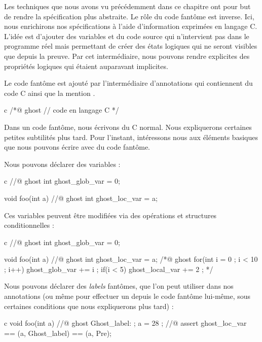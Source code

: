 Les techniques que nous avons vu précédemment dans ce chapitre ont pour but de
rendre la spécification plus abstraite. Le rôle du code fantôme est inverse. Ici,
nous enrichirons nos spécifications à l'aide d'information exprimées
en langage C. L'idée est d'ajouter des variables et du code source qui
n'intervient pas dans le programme réel mais permettant de créer des états
logiques qui ne seront visibles que depuis la preuve. Par cet intermédiaire,
nous pouvons rendre explicites des propriétés logiques qui étaient auparavant
implicites.




Le code fantôme est ajouté par l'intermédiaire d'annotations qui contiennent
du code C ainsi que la mention .



\begin{CodeBlock}{c}
/*@
  ghost
  // code en langage C
*/
\end{CodeBlock}


Dans un code fantôme, nous écrivons du C normal. Nous expliquerons certaines
petites subtilités plus tard. Pour l'instant, intéressons nous aux éléments
basiques que nous pouvons écrire avec du code fantôme.


Nous pouvons déclarer des variables :


\begin{CodeBlock}{c}
//@ ghost int ghost_glob_var = 0;

void foo(int a){
  //@ ghost int ghost_loc_var = a;
}
\end{CodeBlock}


Ces variables peuvent être modifiées via des opérations et structures
conditionnelles :


\begin{CodeBlock}{c}
//@ ghost int ghost_glob_var = 0;

void foo(int a){
  //@ ghost int ghost_loc_var = a;
  /*@ ghost
    for(int i = 0 ; i < 10 ; i++){
      ghost_glob_var += i ;
      if(i < 5) ghost_local_var += 2 ;
    }
  */
}
\end{CodeBlock}


Nous pouvons déclarer des \textit{labels} fantômes, que l'on peut utiliser dans
nos annotations (ou même pour effectuer un  depuis le code
fantôme lui-même, sous certaines conditions que nous expliquerons plus tard) :


\begin{CodeBlock}{c}
void foo(int a){
  //@ ghost Ghost_label: ;
  a = 28 ;
  //@ assert ghost_loc_var == \at(a, Ghost_label) == \at(a, Pre);
}
\end{CodeBlock}


